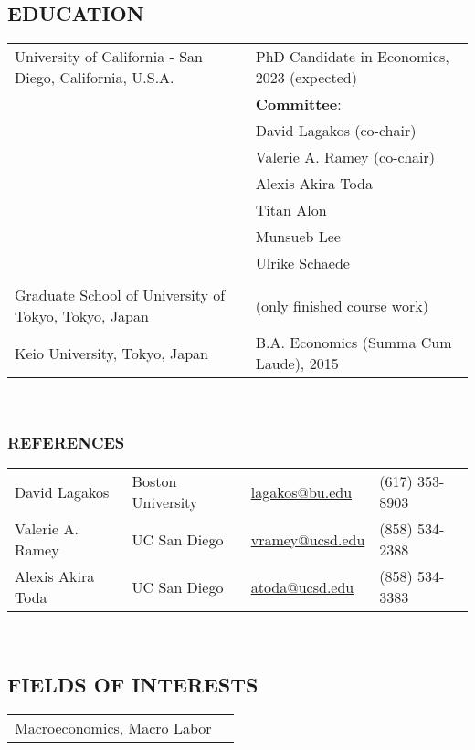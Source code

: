 \documentclass{article}
\begin{document}
\subsection*{EDUCATION}  

\begin{tabularx}{\textwidth}{XX}

University of California - San Diego, California, U.S.A. & PhD Candidate in Economics, 2023 (expected) \\  
 & \textbf{Committee}: \\
 & David Lagakos (co-chair) \\
 & Valerie A. Ramey (co-chair) \\
 & Alexis Akira Toda \\
 & Titan Alon \\
 & Munsueb Lee \\
 & Ulrike Schaede \\
 \\

Graduate School of University of Tokyo, Tokyo, Japan & (only finished course work) \\
Keio University, Tokyo, Japan &  B.A. Economics (Summa Cum Laude), 2015 \\  
\end{tabularx}\\


\subsubsection*{REFERENCES}


\begin{tabularx}{\textwidth}{XXXX}
David Lagakos & Boston University & \href{mailto:lagakos@bu.edu}{lagakos@bu.edu} & (617) 353-8903 \\
Valerie A. Ramey & UC San Diego & \href{mailto:vramey@ucsd.edu}{vramey@ucsd.edu} & (858) 534-2388\\
Alexis Akira Toda & UC San Diego & \href{mailto:atoda@ucsd.edu}{atoda@ucsd.edu} & (858) 534-3383 \\
\end{tabularx}\\



\subsection*{FIELDS OF INTERESTS}
\begin{tabularx}{\textwidth}{XX}
Macroeconomics, Macro Labor \\
\end{tabularx}\\
\end{document}
